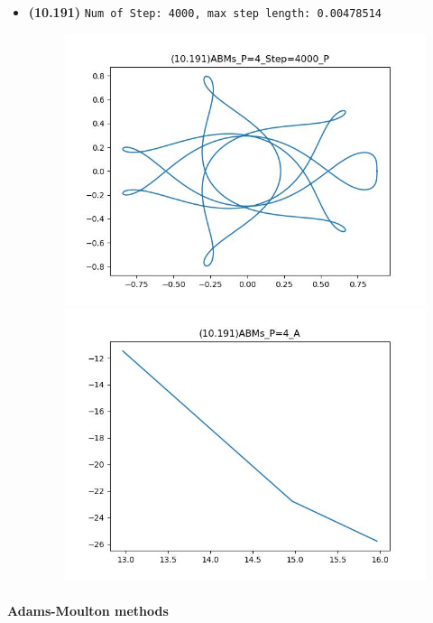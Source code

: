 \documentclass{article}
\begin{document}
\begin{enumerate}
\begin{itemize}
\begin{figure}[h]
        \end{figure}
        \item \textbf{(10.191)} \verb|Num of Step: 4000, max step length: 0.00478514|
        \begin{figure}[h]
            \centering
            \includegraphics[width = 0.45\linewidth]{(10.191)ABMs_P=4_Step=4000_P.jpg}
            \includegraphics[width = 0.45\linewidth]{(10.191)ABMs_P=4_A.jpg}
        \end{figure}
    \end{itemize}
\end{enumerate}

\paragraph{Adams-Moulton methods}
\end{document}
